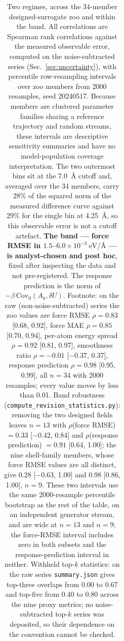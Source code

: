 \documentclass[aip,jcp,reprint,amsmath,amssymb,floatfix]{revtex4-2}
\newcommand{\dU}{\ensuremath{\delta U}}
\newcommand{\Cov}{\ensuremath{\mathrm{Cov}}}
\newcommand{\eVA}{\ensuremath{\mathrm{eV}/\text{\AA}}}
\begin{document}
\begin{table}[t]
\caption{\label{tab:regimes}%
Two regimes, across the 34-member designed-surrogate zoo and within the band.
All correlations are Spearman rank correlations against the measured observable
error, computed on the noise-subtracted series (Sec.~\ref{sec:uncertainty}),
with percentile row-resampling intervals over zoo members from 2000 resamples,
seed 20240517. Because members are clustered parameter families sharing a
reference trajectory and random streams, these intervals are descriptive
sensitivity summaries and have no model-population coverage interpretation. The
two outermost bins sit at the $7.0$~\AA{} cutoff and,
averaged over the 34 members, carry 28\% of the squared norm of the measured
difference curve against 29\% for the single bin at 4.25~\AA, so this observable
error is not a cutoff artefact. \textbf{The band --- force RMSE in
$1.5$--$6.0\times10^{-3}~\eVA$ --- is analyst-chosen and post hoc}, fixed after
inspecting the data and not pre-registered. The response prediction is the norm
of $-\beta\,\Cov_0(A_k,\dU)$. Footnote: on the raw (non-noise-subtracted) series
the zoo values are force RMSE $\rho = 0.83$ [0.68, 0.92], force MAE
$\rho = 0.85$ [0.70, 0.94], per-atom energy spread $\rho = 0.92$ [0.81, 0.97],
smoothness ratio $\rho = -0.01$ [$-0.37$, 0.37], response prediction
$\rho = 0.98$ [0.95, 0.99], all $n = 34$ with 2000 resamples; every value moves
by less than 0.01. Band robustness (\texttt{compute\_revision\_statistics.py}):
removing the two designed fields leaves $n = 13$ with $\rho$(force RMSE)
$= 0.33$ [$-0.42$, 0.84] and $\rho$(response prediction) $= 0.91$ [0.64, 1.00];
the nine shell-family members, whose force RMSE values are all distinct, give
0.28 [$-0.63$, 1.00] and 0.98 [0.86, 1.00], $n = 9$. These two intervals use the
same 2000-resample percentile bootstrap as the rest of the table, on an
independent generator stream, and are wide at $n = 13$ and $n = 9$; the
force-RMSE interval includes zero in both subsets and the response-prediction
interval in neither. Withheld top-$k$ statistics: on the raw series
\texttt{summary.json} gives top-three overlaps from 0.00 to 0.67 and top-five
from 0.40 to 0.80 across the nine proxy metrics; no noise-subtracted top-$k$
series was deposited, so their dependence on the convention cannot be checked.}
\begin{ruledtabular}
\begin{tabular}{lcc}

\end{tabular}
\end{ruledtabular}
\end{table}
\end{document}
